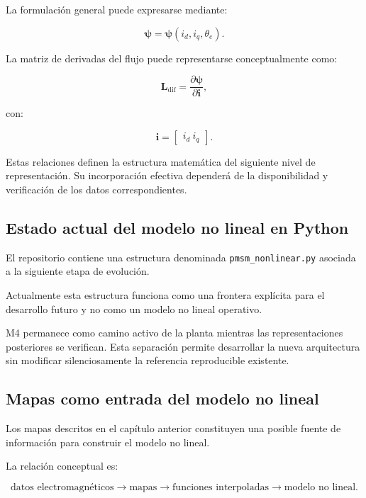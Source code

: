 La formulación general puede expresarse mediante:

\begin{equation}
\boldsymbol{\psi}
=
\boldsymbol{\psi}(i_d,i_q,\theta_e).
\end{equation}

La matriz de derivadas del flujo puede representarse conceptualmente como:

\begin{equation}
\mathbf{L}_{\mathrm{dif}}
=
\frac{\partial\boldsymbol{\psi}}
{\partial\mathbf{i}},
\end{equation}

con:

\begin{equation}
\mathbf{i}
=
\begin{bmatrix}
i_d\
i_q
\end{bmatrix}.
\end{equation}

Estas relaciones definen la estructura matemática del siguiente nivel de representación. Su incorporación efectiva dependerá de la disponibilidad y verificación de los datos correspondientes.

\subsection{Estado actual del modelo no lineal en Python}

El repositorio contiene una estructura denominada \texttt{pmsm\_nonlinear.py} asociada a la siguiente etapa de evolución.

Actualmente esta estructura funciona como una frontera explícita para el desarrollo futuro y no como un modelo no lineal operativo.

M4 permanece como camino activo de la planta mientras las representaciones posteriores se verifican. Esta separación permite desarrollar la nueva arquitectura sin modificar silenciosamente la referencia reproducible existente.

\subsection{Mapas como entrada del modelo no lineal}

Los mapas descritos en el capítulo anterior constituyen una posible fuente de información para construir el modelo no lineal.

La relación conceptual es:

\begin{equation}
\text{datos electromagnéticos}
\rightarrow
\text{mapas}
\rightarrow
\text{funciones interpoladas}
\rightarrow
\text{modelo no lineal}.
\end{equation}

